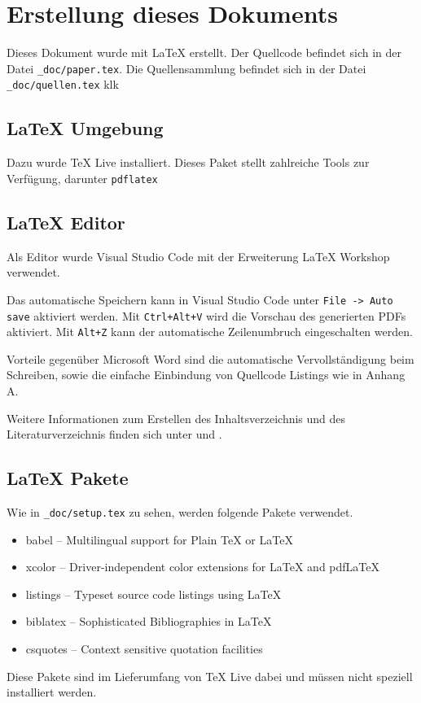 \newpage
\section{Erstellung dieses Dokuments}
Dieses Dokument wurde mit LaTeX erstellt. Der Quellcode befindet sich in der Datei
\verb|_doc/paper.tex|. Die Quellensammlung befindet sich in der Datei \verb|_doc/quellen.tex| klk

\subsection{LaTeX Umgebung}
Dazu wurde TeX Live \cite{texlive} installiert. Dieses
Paket stellt zahlreiche Tools zur Verfügung, darunter  \verb|pdflatex|

\subsection{LaTeX Editor}
Als Editor wurde Visual Studio Code \cite{vscode} mit der Erweiterung LaTeX Workshop \cite{latexWorkshop} verwendet.

Das automatische Speichern kann in Visual Studio Code unter \verb|File -> Auto save| aktiviert werden. Mit \verb|Ctrl+Alt+V| wird die Vorschau des generierten PDFs aktiviert. Mit \verb|Alt+Z| kann der automatische Zeilenumbruch eingeschalten werden.

Vorteile gegenüber Microsoft Word sind die automatische Vervollständigung beim Schreiben, sowie die einfache Einbindung von Quellcode Listings wie in Anhang A.

Weitere Informationen zum Erstellen des Inhaltsverzeichnis und des Literaturverzeichnis finden sich unter \cite{inhaltsverzeichnis} und \cite{literaturverzeichnis}.

\subsection{LaTeX Pakete}
Wie in \verb|_doc/setup.tex| zu sehen, werden folgende Pakete verwendet.
\begin{itemize}
    \item babel -- Multilingual support for Plain TeX or LaTeX
    \item xcolor -- Driver-independent color extensions for LaTeX and pdfLaTeX
    \item listings -- Typeset source code listings using LaTeX
    \item biblatex -- Sophisticated Bibliographies in LaTeX
    \item csquotes -- Context sensitive quotation facilities
\end{itemize}
Diese Pakete sind im Lieferumfang von TeX Live dabei und müssen nicht speziell installiert werden.
